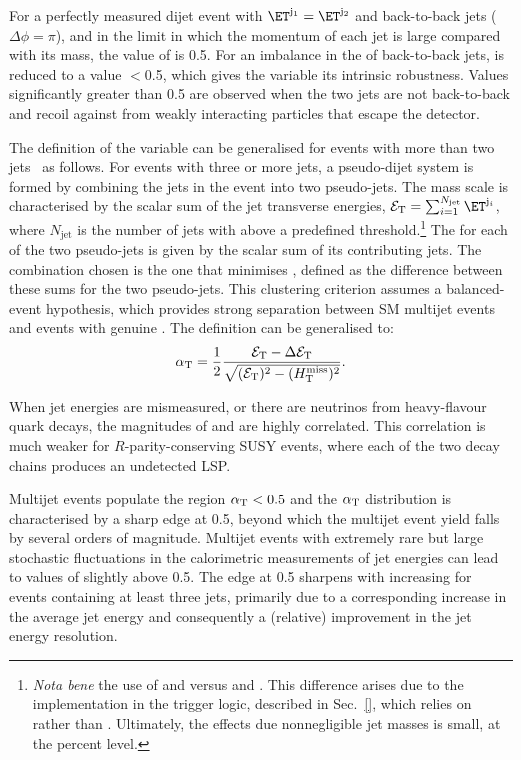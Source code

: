 For a perfectly measured dijet event with $\ET^{\mathrm{j_1}} =
\ET^{\mathrm{j_2}}$ and back-to-back jets ($\Delta\phi = \pi$), and in
the limit in which the momentum of each jet is large compared with its
mass, the value of \alphat is 0.5. For an imbalance in the \ET of
back-to-back jets, \alphat is reduced to a value $<$0.5, which gives
the variable its intrinsic robustness. Values significantly greater
than 0.5 are observed when the two jets are not back-to-back and
recoil against \ptvecmiss from weakly interacting particles that
escape the detector.

The definition of the \alphat variable can be generalised for events
with more than two jets~\cite{RA1Paper} as follows. For events with
three or more jets, a pseudo-dijet system is formed by combining the
jets in the event into two pseudo-jets. The mass scale is
characterised by the scalar sum of the jet transverse energies,
$\scalst = \sum_{i=1}^{N_\text{jet}} \ET^{\mathrm{j}_i}$, where
$N_\text{jet}$ is the number of jets with \ET above a predefined
threshold.\footnote{{\it Nota bene} the use of \Et and \scalst versus
  \Pt and \scalht. This difference arises due to the implementation in
  the trigger logic, described in Sec.~\ref{}, which relies on \Et
  rather than \Pt. Ultimately, the effects due nonnegligible jet
  masses is small, at the percent level.} The \scalst for each of the
two pseudo-jets is given by the scalar \ET sum of its contributing
jets. The combination chosen is the one that minimises \dst, defined
as the difference between these sums for the two pseudo-jets.  This
clustering criterion assumes a balanced-event hypothesis, which
provides strong separation between SM multijet events and events with
genuine \ptvecmiss. The \alphat definition can be generalised to:
\begin{equation}
  \label{eq:alphat}
  \alpha_{\text{T}} = \frac{1}{2} \frac{\mathcal{E}_\mathrm{T} -
    \Delta\mathcal{E}_\mathrm{T}}{\sqrt{(\mathcal{E}_\mathrm{T})^2 - (\mbox{$H_{\rm T}^{\rm miss}$})^2}}.
\end{equation}

When jet energies are mismeasured, or there are neutrinos from
heavy-flavour quark decays, the magnitudes of \HTmiss and \dst are
highly correlated. This correlation is much weaker for
$R$-parity-conserving SUSY events, where each of the two decay chains
produces an undetected LSP.

Multijet events populate the region $\alpha_{\text{T}}< 0.5$ and the $\alpha_{\text{T}}$
distribution is characterised by a sharp edge at 0.5, beyond which the
multijet event yield falls by several orders of magnitude. Multijet
events with extremely rare but large stochastic fluctuations in the
calorimetric measurements of jet energies can lead to values of
\alphat slightly above 0.5. The edge at 0.5 sharpens with increasing
\scalht for events containing at least three jets, primarily due to a
corresponding increase in the average jet energy and consequently a
(relative) improvement in the jet energy resolution. 

